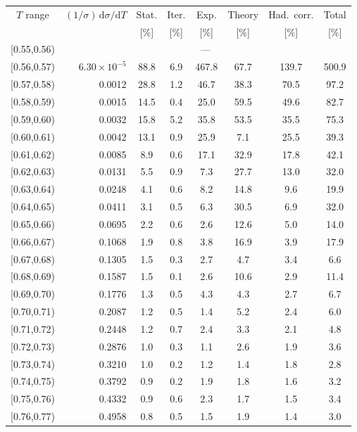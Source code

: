 \begin{table}[t!]
\centering
\scriptsize
\begin{tabular}{c r c c c c c c}
\hline
$T$ range & $(1/\sigma)\,\mathrm{d}\sigma/\mathrm{d}T$ & Stat. & Iter. & Exp. & Theory & Had.\ corr. & Total \\
 & & [\%] & [\%] & [\%] & [\%] & [\%] & [\%] \\
\hline
[0.55,0.56) & \multicolumn{7}{c}{---} \\
{[0.56,0.57)} & $6.30\times10^{-5}$ & 88.8 & 6.9 & 467.8 & 67.7 & 139.7 & 500.9 \\
{[0.57,0.58)} & 0.0012 & 28.8 & 1.2 & 46.7 & 38.3 & 70.5 & 97.2 \\
{[0.58,0.59)} & 0.0015 & 14.5 & 0.4 & 25.0 & 59.5 & 49.6 & 82.7 \\
{[0.59,0.60)} & 0.0032 & 15.8 & 5.2 & 35.8 & 53.5 & 35.5 & 75.3 \\
{[0.60,0.61)} & 0.0042 & 13.1 & 0.9 & 25.9 & 7.1 & 25.5 & 39.3 \\
{[0.61,0.62)} & 0.0085 & 8.9 & 0.6 & 17.1 & 32.9 & 17.8 & 42.1 \\
{[0.62,0.63)} & 0.0131 & 5.5 & 0.9 & 7.3 & 27.7 & 13.0 & 32.0 \\
{[0.63,0.64)} & 0.0248 & 4.1 & 0.6 & 8.2 & 14.8 & 9.6 & 19.9 \\
{[0.64,0.65)} & 0.0411 & 3.1 & 0.5 & 6.3 & 30.5 & 6.9 & 32.0 \\
{[0.65,0.66)} & 0.0695 & 2.2 & 0.6 & 2.6 & 12.6 & 5.0 & 14.0 \\
{[0.66,0.67)} & 0.1068 & 1.9 & 0.8 & 3.8 & 16.9 & 3.9 & 17.9 \\
{[0.67,0.68)} & 0.1305 & 1.5 & 0.3 & 2.7 & 4.7 & 3.4 & 6.6 \\
{[0.68,0.69)} & 0.1587 & 1.5 & 0.1 & 2.6 & 10.6 & 2.9 & 11.4 \\
{[0.69,0.70)} & 0.1776 & 1.3 & 0.5 & 4.3 & 4.3 & 2.7 & 6.7 \\
{[0.70,0.71)} & 0.2087 & 1.2 & 0.5 & 1.4 & 5.2 & 2.4 & 6.0 \\
{[0.71,0.72)} & 0.2448 & 1.2 & 0.7 & 2.4 & 3.3 & 2.1 & 4.8 \\
{[0.72,0.73)} & 0.2876 & 1.0 & 0.3 & 1.1 & 2.6 & 1.9 & 3.6 \\
{[0.73,0.74)} & 0.3210 & 1.0 & 0.2 & 1.2 & 1.4 & 1.8 & 2.8 \\
{[0.74,0.75)} & 0.3792 & 0.9 & 0.2 & 1.9 & 1.8 & 1.6 & 3.2 \\
{[0.75,0.76)} & 0.4332 & 0.9 & 0.6 & 2.3 & 1.7 & 1.5 & 3.4 \\
{[0.76,0.77)} & 0.4958 & 0.8 & 0.5 & 1.5 & 1.9 & 1.4 & 3.0 \\

\end{tabular}
\end{table}
